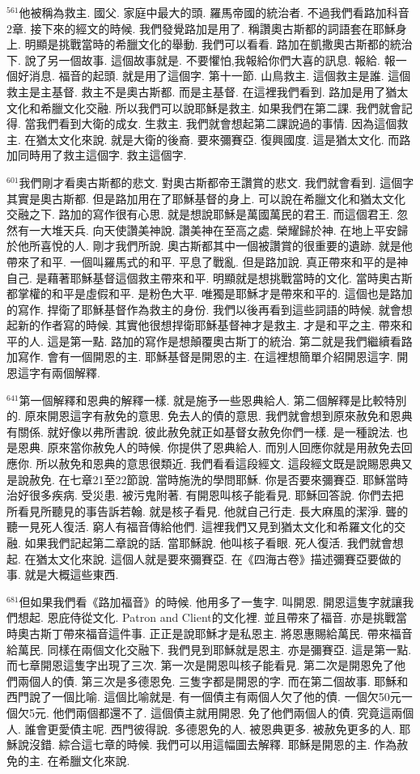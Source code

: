 \documentclass{book}
\begin{document}
$^{561}$他被稱為救主.
國父.
家庭中最大的頭.
羅馬帝國的統治者.
不過我們看路加科音2章.
接下來的經文的時候.
我們發覺路加是用了.
稱讚奧古斯都的詞語套在耶穌身上.
明顯是挑戰當時的希臘文化的舉動.
我們可以看看.
路加在凱撒奧古斯都的統治下.
說了另一個故事.
這個故事就是.
不要懼怕,我報給你們大喜的訊息.
報給.
報一個好消息.
福音的起頭.
就是用了這個字.
第十一節.
山鳥救主.
這個救主是誰.
這個救主是主基督.
救主不是奧古斯都.
而是主基督.
在這裡我們看到.
路加是用了猶太文化和希臘文化交融.
所以我們可以說耶穌是救主.
如果我們在第二課.
我們就會記得.
當我們看到大衛的成女.
生救主.
我們就會想起第二課說過的事情.
因為這個救主.
在猶太文化來說.
就是大衛的後裔.
要來彌賽亞.
復興國度.
這是猶太文化.
而路加同時用了救主這個字.
救主這個字.

$^{601}$我們剛才看奧古斯都的悲文.
對奧古斯都帝王讚賞的悲文.
我們就會看到.
這個字其實是奧古斯都.
但是路加用在了耶穌基督的身上.
可以說在希臘文化和猶太文化交融之下.
路加的寫作很有心思.
就是想說耶穌是萬國萬民的君王.
而這個君王.
忽然有一大堆天兵.
向天使讚美神說.
讚美神在至高之處.
榮耀歸於神.
在地上平安歸於他所喜悅的人.
剛才我們所說.
奧古斯都其中一個被讚賞的很重要的遺跡.
就是他帶來了和平.
一個叫羅馬式的和平.
平息了戰亂.
但是路加說.
真正帶來和平的是神自己.
是藉著耶穌基督這個救主帶來和平.
明顯就是想挑戰當時的文化.
當時奧古斯都掌權的和平是虛假和平.
是粉色大平.
唯獨是耶穌才是帶來和平的.
這個也是路加的寫作.
捍衛了耶穌基督作為救主的身份.
我們以後再看到這些詞語的時候.
就會想起新的作者寫的時候.
其實他很想捍衛耶穌基督神才是救主.
才是和平之主.
帶來和平的人.
這是第一點.
路加的寫作是想顛覆奧古斯丁的統治.
第二就是我們繼續看路加寫作.
會有一個開恩的主.
耶穌基督是開恩的主.
在這裡想簡單介紹開恩這字.
開恩這字有兩個解釋.

$^{641}$第一個解釋和恩典的解釋一樣.
就是施予一些恩典給人.
第二個解釋是比較特別的.
原來開恩這字有赦免的意思.
免去人的債的意思.
我們就會想到原來赦免和恩典有關係.
就好像以弗所書說.
彼此赦免就正如基督女赦免你們一樣.
是一種說法.
也是恩典.
原來當你赦免人的時候.
你提供了恩典給人.
而別人回應你就是用赦免去回應你.
所以赦免和恩典的意思很類近.
我們看看這段經文.
這段經文既是說賜恩典又是說赦免.
在七章21至22節說.
當時施洗的學問耶穌.
你是否要來彌賽亞.
耶穌當時治好很多疾病.
受災患.
被污鬼附著.
有開恩叫核子能看見.
耶穌回答說.
你們去把所看見所聽見的事告訴若翰.
就是核子看見.
他就自己行走.
長大麻風的潔淨.
聾的聽一見死人復活.
窮人有福音傳給他們.
這裡我們又見到猶太文化和希羅文化的交融.
如果我們記起第二章說的話.
當耶穌說.
他叫核子看眼.
死人復活.
我們就會想起.
在猶太文化來說.
這個人就是要來彌賽亞.
在《四海古卷》描述彌賽亞要做的事.
就是大概這些東西.

$^{681}$但如果我們看《路加福音》的時候.
他用多了一隻字.
叫開恩.
開恩這隻字就讓我們想起.
恩庇侍從文化.
Patron and Client的文化裡.
並且帶來了福音.
亦是挑戰當時奧古斯丁帶來福音這件事.
正正是說耶穌才是私恩主.
將恩惠賜給萬民.
帶來福音給萬民.
同樣在兩個文化交融下.
我們見到耶穌就是恩主.
亦是彌賽亞.
這是第一點.
而七章開恩這隻字出現了三次.
第一次是開恩叫核子能看見.
第二次是開恩免了他們兩個人的債.
第三次是多德恩免.
三隻字都是開恩的字.
而在第二個故事.
耶穌和西門說了一個比喻.
這個比喻就是.
有一個債主有兩個人欠了他的債.
一個欠50元一個欠5元.
他們兩個都還不了.
這個債主就用開恩.
免了他們兩個人的債.
究竟這兩個人.
誰會更愛債主呢.
西門彼得說.
多德恩免的人.
被恩典更多.
被赦免更多的人.
耶穌說沒錯.
綜合這七章的時候.
我們可以用這幅圖去解釋.
耶穌是開恩的主.
作為赦免的主.
在希臘文化來說.
\end{document}
